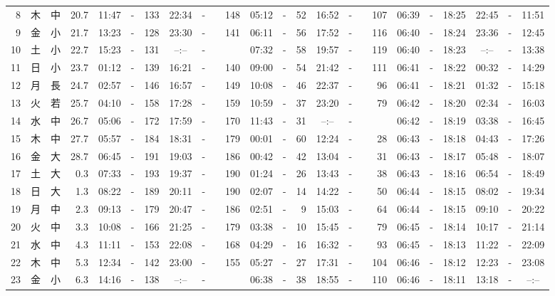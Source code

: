\documentclass[12pt,a4j]{jsarticle}
\begin{document}
\begin{table}[htbp]
\begin{center}
{\begin{tabular}{|rc|cr|ccrccr|ccrccr|ccc|ccc|}
 8 & 木 & 中 & 20.7 &  11:47 &-& 133 &  22:34 &-& 148 &  05:12 &-&  52 &  16:52 &-& 107 & 06:39 & -& 18:25 & 22:45 & -& 11:51 \\
 9 & 金 & 小 & 21.7 &  13:23 &-& 128 &  23:30 &-& 141 &  06:11 &-&  56 &  17:52 &-& 116 & 06:40 & -& 18:24 & 23:36 & -& 12:45 \\
10 & 土 & 小 & 22.7 &  15:23 &-& 131 &  --:-- &-&~~~~~ &  07:32 &-&  58 &  19:57 &-& 119 & 06:40 & -& 18:23 & --:-- & -& 13:38 \\
11 & 日 & 小 & 23.7 &  01:12 &-& 139 &  16:21 &-& 140 &  09:00 &-&  54 &  21:42 &-& 111 & 06:41 & -& 18:22 & 00:32 & -& 14:29 \\
12 & 月 & 長 & 24.7 &  02:57 &-& 146 &  16:57 &-& 149 &  10:08 &-&  46 &  22:37 &-&  96 & 06:41 & -& 18:21 & 01:32 & -& 15:18 \\
13 & 火 & 若 & 25.7 &  04:10 &-& 158 &  17:28 &-& 159 &  10:59 &-&  37 &  23:20 &-&  79 & 06:42 & -& 18:20 & 02:34 & -& 16:03 \\
14 & 水 & 中 & 26.7 &  05:06 &-& 172 &  17:59 &-& 170 &  11:43 &-&  31 &  --:-- &-&~~~~~ & 06:42 & -& 18:19 & 03:38 & -& 16:45 \\
15 & 木 & 中 & 27.7 &  05:57 &-& 184 &  18:31 &-& 179 &  00:01 &-&  60 &  12:24 &-&  28 & 06:43 & -& 18:18 & 04:43 & -& 17:26 \\
16 & 金 & 大 & 28.7 &  06:45 &-& 191 &  19:03 &-& 186 &  00:42 &-&  42 &  13:04 &-&  31 & 06:43 & -& 18:17 & 05:48 & -& 18:07 \\
17 & 土 & 大 &  0.3 &  07:33 &-& 193 &  19:37 &-& 190 &  01:24 &-&  26 &  13:43 &-&  38 & 06:43 & -& 18:16 & 06:54 & -& 18:49 \\
18 & 日 & 大 &  1.3 &  08:22 &-& 189 &  20:11 &-& 190 &  02:07 &-&  14 &  14:22 &-&  50 & 06:44 & -& 18:15 & 08:02 & -& 19:34 \\
19 & 月 & 中 &  2.3 &  09:13 &-& 179 &  20:47 &-& 186 &  02:51 &-&   9 &  15:03 &-&  64 & 06:44 & -& 18:15 & 09:10 & -& 20:22 \\
20 & 火 & 中 &  3.3 &  10:08 &-& 166 &  21:25 &-& 179 &  03:38 &-&  10 &  15:45 &-&  79 & 06:45 & -& 18:14 & 10:17 & -& 21:14 \\
21 & 水 & 中 &  4.3 &  11:11 &-& 153 &  22:08 &-& 168 &  04:29 &-&  16 &  16:32 &-&  93 & 06:45 & -& 18:13 & 11:22 & -& 22:09 \\
22 & 木 & 中 &  5.3 &  12:34 &-& 142 &  23:00 &-& 155 &  05:27 &-&  27 &  17:31 &-& 104 & 06:46 & -& 18:12 & 12:23 & -& 23:08 \\
23 & 金 & 小 &  6.3 &  14:16 &-& 138 &  --:-- &-&~~~~~ &  06:38 &-&  38 &  18:55 &-& 110 & 06:46 & -& 18:11 & 13:18 & -& --:-- \\

\end{tabular}}
\end{center}
\end{table}
\end{document}
